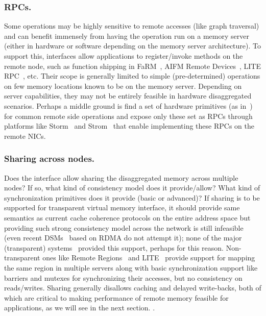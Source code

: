 \subsubsection{RPCs.} Some operations may be 
highly sensitive to remote accesses (like graph traversal) 
and can benefit immensely from having the operation 
run on a memory server (either in hardware or software 
depending on the memory server architecture). To support this,
interfaces allow applications to register/invoke methods on 
the remote node, such as function shipping in FaRM~\cite{farm}, 
AIFM Remote Devices~\cite{aifm}, LITE RPC~\cite{literdma}, etc.
Their scope is generally limited to simple (pre-determined) 
operations on few memory locations known to be on the memory 
server. Depending on server capabilities, they may not be
entirely feasible in hardware disaggregated scenarios.
Perhaps a middle ground is find a set of hardware primitives 
(as in~\cite{Aguilera2019}) for common remote side operations and 
expose only these set as RPCs through platforms like 
Storm~\cite{storm} and Strom~\cite{strom} that enable  
implementing these RPCs on the remote NICs.    

\subsubsection{Sharing across nodes.} Does the interface allow 
sharing the disaggregated memory across multiple nodes? If so, 
what kind of consistency model does it provide/allow? What 
kind of synchronization primitives does it provide (basic 
or advanced)? If sharing is to be supported for transparent virtual 
memory interface, it should provide same semantics as current 
cache coherence protocols on the entire address space but 
providing such strong consistency model across the network 
is still infeasible (even recent DSMs~\cite{farm,gam} based on 
RDMA do not attempt it); none of the major (transparent) systems~\cite{infiniswap,legoos} provided this support, perhaps for 
this reason. Non-transparent ones like 
Remote Regions~\cite{remregions} and LITE~\cite{literdma} provide
support for mapping the same region in multiple servers along with
basic synchronization support like barriers and mutexes for 
synchronizing their accesses, but no consistency on reads/writes. 
Sharing generally disallows caching and delayed write-backs,
both of which are critical to making performance of remote memory 
feasible for applications, as we will see in the next section.
.